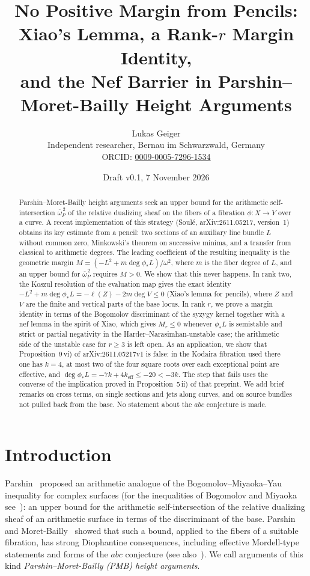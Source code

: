 \documentclass[11pt]{article}
\title{No Positive Margin from Pencils:\\ Xiao's Lemma, a Rank-$r$ Margin Identity,\\ and the Nef Barrier in Parshin--Moret-Bailly Height Arguments}
\author{Lukas Geiger\\
Independent researcher, Bernau im Schwarzwald, Germany\\
ORCID: \href{https://orcid.org/0009-0005-7296-1534}{0009-0005-7296-1534}}
\date{Draft v0.1, 7 November 2026}
\theoremstyle{definition}
\theoremstyle{remark}
\newcommand{\ob}{\overline{\omega}}
\begin{document}
\maketitle

\begin{abstract}
Parshin--Moret-Bailly height arguments seek an upper bound for the arithmetic
self-intersection $\ob_P^{\,2}$ of the relative dualizing sheaf on the fibers
of a fibration $\phi\colon X\to Y$ over a curve. A recent implementation of this
strategy (Soul\'e, arXiv:2611.05217, version~1) obtains its key estimate from a
pencil: two sections of an auxiliary line bundle $L$ without common zero,
Minkowski's theorem on successive minima, and a transfer from classical to
arithmetic degrees. The leading coefficient of the resulting inequality is the
geometric margin $M=(-L^2+m\deg\phi_*L)/\omega^2$, where $m$ is the fiber degree
of $L$, and an upper bound for $\ob_P^{\,2}$ requires $M>0$. We show that this
never happens. In rank two, the Koszul resolution of the evaluation map gives the
exact identity $-L^2+m\deg\phi_*L=-\ell(Z)-2m\deg V\le 0$ (Xiao's lemma for
pencils), where $Z$ and $V$ are the finite and vertical parts of the base
locus. In rank $r$, we prove a margin identity in terms of the Bogomolov
discriminant of the syzygy kernel together with a nef lemma in the spirit of
Xiao, which gives $M_r\le 0$ whenever $\phi_*L$ is semistable and strict or
partial negativity in the Harder--Narasimhan-unstable case; the arithmetic side
of the unstable case for $r\ge 3$ is left open. As an application, we show that
Proposition~9\,vi) of arXiv:2611.05217v1 is false: in the Kodaira fibration used
there one has $k=4$, at most two of the four square roots over each exceptional
point are effective, and $\deg\phi_*L=-7k+4k_{\mathrm{eff}}\le -20<-3k$. The step
that fails uses the converse of the implication proved in Proposition~5\,ii) of
that preprint. We add brief remarks on cross terms, on single sections and jets
along curves, and on source bundles not pulled back from the base. No statement
about the $abc$ conjecture is made.
\end{abstract}

\section{Introduction}\label{sec:intro}

Parshin~\cite{Pa88} proposed an arithmetic analogue of the
Bogomolov--Miyaoka--Yau inequality for complex surfaces (for the inequalities of
Bogomolov and Miyaoka see~\cite{Bo78,Mi77}): an upper bound for the arithmetic
self-intersection of the relative dualizing sheaf of an arithmetic surface in
terms of the discriminant of the base. Parshin and
Moret-Bailly~\cite{Pa88,MB90} showed that such a bound, applied to the fibers of
a suitable fibration, has strong Diophantine consequences, including effective
Mordell-type statements and forms of the $abc$ conjecture
(see also~\cite{So05}). We call arguments
of this kind \emph{Parshin--Moret-Bailly (PMB) height arguments}.
\end{document}
